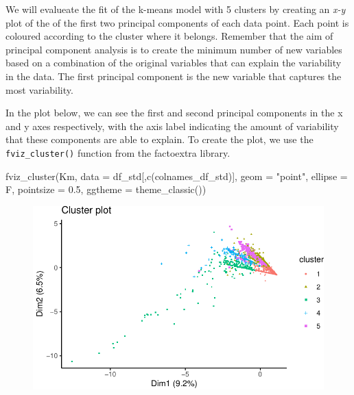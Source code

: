 \documentclass[
  letterpaper,
  DIV=11,
  numbers=noendperiod]{scrreprt}
\newenvironment{Shaded}{\begin{snugshade}}{\end{snugshade}}
\newcommand{\AttributeTok}[1]{\textcolor[rgb]{0.40,0.45,0.13}{#1}}
\newcommand{\FloatTok}[1]{\textcolor[rgb]{0.68,0.00,0.00}{#1}}
\newcommand{\FunctionTok}[1]{\textcolor[rgb]{0.28,0.35,0.67}{#1}}
\newcommand{\NormalTok}[1]{\textcolor[rgb]{0.00,0.23,0.31}{#1}}
\newcommand{\StringTok}[1]{\textcolor[rgb]{0.13,0.47,0.30}{#1}}
\begin{document}
We will evalueate the fit of the k-means model with 5 clusters by
creating an \emph{x-y} plot of the of the first two principal components
of each data point. Each point is coloured according to the cluster
where it belongs. Remember that the aim of principal component analysis
is to create the minimum number of new variables based on a combination
of the original variables that can explain the variability in the data.
The first principal component is the new variable that captures the most
variability.

In the plot below, we can see the first and second principal components
in the x and y axes respectively, with the axis label indicating the
amount of variability that these components are able to explain. To
create the plot, we use the \texttt{fviz\_cluster()} function from the
factoextra library.

\begin{Shaded}
\begin{Highlighting}[]
\FunctionTok{fviz\_cluster}\NormalTok{(Km, }\AttributeTok{data =}\NormalTok{ df\_std[,}\FunctionTok{c}\NormalTok{(colnames\_df\_std)], }\AttributeTok{geom =} \StringTok{"point"}\NormalTok{, }\AttributeTok{ellipse =}\NormalTok{ F, }\AttributeTok{pointsize =} \FloatTok{0.5}\NormalTok{,}
\AttributeTok{ggtheme =} \FunctionTok{theme\_classic}\NormalTok{())}
\end{Highlighting}
\end{Shaded}

\begin{figure}[H]

{\centering \includegraphics{geodemographics_files/figure-pdf/unnamed-chunk-20-1.pdf}

}

\end{figure}
\end{document}
